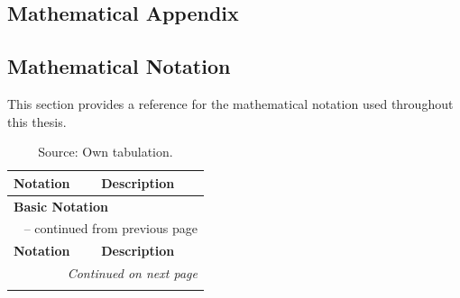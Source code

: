 \begin{appendices}
  \chapter{Mathematical Appendix}
  \section{Mathematical Notation}
  \label{app:math_notation}

  This section provides a reference for the mathematical notation used throughout this thesis.

  \begingroup
  \begin{longtable}{p{}p{}}
    \caption[Summary of Mathematical Notation]{Mathematical Notation} \label{tab:math_notation}                                        \\

    \toprule
    \textbf{Notation}                           & \textbf{Description}                                                                 \\
    \midrule
    \multicolumn{2}{l}{\textbf{Basic Notation}}                                                                                        \\
    \midrule
    \endfirsthead

    \multicolumn{2}{c}{\tablename\ \thetable{} -- continued from previous page}                                                        \\
    \toprule
    \textbf{Notation}                           & \textbf{Description}                                                                 \\
    \midrule
    \endhead

    \midrule
    \multicolumn{2}{r}{\textit{Continued on next page}}                                                                                \\
    \endfoot

    \bottomrule
    \caption*{Source: Own tabulation.}
    \endlastfoot


\end{longtable}
\end{appendices}
